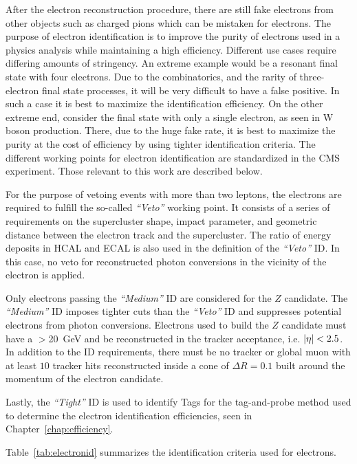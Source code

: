 After the electron reconstruction procedure, there are still fake electrons from 
other objects such as charged pions which can be mistaken for electrons.
The purpose of electron identification is to improve the purity of electrons used in a physics analysis while maintaining a high efficiency.
Different use cases require differing amounts of stringency.
An extreme example would be a resonant final state with four electrons.
Due to the combinatorics, and the rarity of three-electron final state processes, it will be very difficult to have a false positive.
In such a case it is best to maximize the identification efficiency.
On the other extreme end, consider the final state with only a single electron,
as seen in W boson production. There, due to the huge fake rate, it is best to maximize the purity at the cost of efficiency by using tighter identification criteria.
The different working points for electron identification are standardized in the CMS experiment.
Those relevant to this work are described below.

For the purpose of vetoing events with more than two leptons, the electrons are required to fulfill the so-called {\em ``Veto''} working point. It consists of a series of requirements
on the supercluster shape, impact parameter,
and geometric distance between the electron track and the supercluster.
The ratio of energy deposits in HCAL and ECAL is also used in the definition of the {\em ``Veto''} ID.
In this case, no veto for reconstructed photon conversions in the vicinity of the electron is applied.

Only electrons passing the {\em ``Medium''} ID are considered for the $Z$ candidate. The {\em ``Medium''} ID
imposes tighter cuts than the {\em ``Veto''} ID and suppresses potential electrons from photon conversions.
Electrons used to build the $Z$ candidate must have a \pt$>$20~GeV and be reconstructed in the tracker acceptance, i.e. $\lvert \eta \rvert< 2.5$.
In addition to the ID requirements, there must be no tracker or global muon with at least $10$ tracker
hits reconstructed inside a cone of $\Delta R = 0.1$ built around the momentum of the electron candidate.

Lastly, the {\em ``Tight''} ID is used to identify Tags for the tag-and-probe method used
to determine the electron identification efficiencies, seen in Chapter~\ref{chap:efficiency}.

Table~\ref{tab:electronid} summarizes the identification criteria used for electrons.

